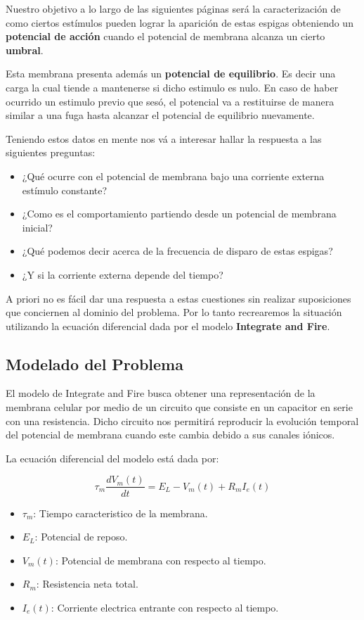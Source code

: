 \documentclass[10pt,journal,compsoc]{IEEEtran}
\begin{document}
Nuestro objetivo a lo largo de las siguientes páginas será la caracterización de
como ciertos estímulos pueden lograr la aparición de estas espigas obteniendo un
\textbf{potencial de acción} cuando el potencial de membrana alcanza un cierto
\textbf{umbral}.

Esta membrana presenta además un \textbf{potencial de equilibrio}. Es decir una
carga la cual tiende a mantenerse si dicho estimulo es nulo. En caso de haber
ocurrido un estimulo previo que sesó, el potencial va a restituirse de manera
similar a una fuga hasta alcanzar el potencial de equilibrio nuevamente.

Teniendo estos datos en mente nos vá a interesar hallar la respuesta a las
siguientes preguntas:
\begin{itemize}
  \item ¿Qué ocurre con el potencial de membrana bajo una corriente externa
  estímulo constante?
  \item ¿Como es el comportamiento partiendo desde un potencial de membrana
  inicial?
  \item ¿Qué podemos decir acerca de la frecuencia de disparo de estas espigas?
  \item ¿Y si la corriente externa depende del tiempo?
\end{itemize}

A priori no es fácil dar una respuesta a estas cuestiones sin realizar
suposiciones que conciernen al dominio del problema. Por lo tanto recrearemos la
situación utilizando la ecuación diferencial dada por el modelo
\textbf{Integrate and Fire}.

\subsection{Modelado del Problema}
El modelo de Integrate and Fire busca obtener una representación de la membrana
celular por medio de un circuito que consiste en un capacitor en serie con una
resistencia. Dicho circuito nos permitirá reproducir la evolución temporal del
potencial de membrana cuando este cambia debido a sus canales iónicos.

La ecuación diferencial del modelo está dada por:

\begin{equation*}
  \tau_m \frac{d V_m(t)}{d t} = E_L - V_m(t) + R_m I_e(t) 
\end{equation*}

\begin{itemize}
  \item $\tau_m$: Tiempo caracteristico de la membrana.
  \item $E_L$: Potencial de reposo.
  \item $V_m(t)$: Potencial de membrana con respecto al tiempo.
  \item $R_m$: Resistencia neta total.
  \item $I_e(t)$: Corriente electrica entrante con respecto al tiempo.
\end{itemize}
\end{document}
